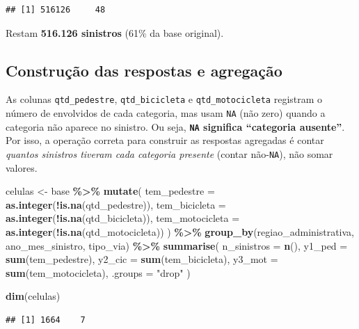 \documentclass[
  11pt,
]{article}
\newenvironment{Shaded}{\begin{snugshade}}{\end{snugshade}}
\newcommand{\AttributeTok}[1]{\textcolor[rgb]{0.13,0.29,0.53}{#1}}
\newcommand{\FunctionTok}[1]{\textcolor[rgb]{0.13,0.29,0.53}{\textbf{#1}}}
\newcommand{\NormalTok}[1]{#1}
\newcommand{\OtherTok}[1]{\textcolor[rgb]{0.56,0.35,0.01}{#1}}
\newcommand{\SpecialCharTok}[1]{\textcolor[rgb]{0.81,0.36,0.00}{\textbf{#1}}}
\newcommand{\StringTok}[1]{\textcolor[rgb]{0.31,0.60,0.02}{#1}}
\begin{document}
\begin{verbatim}
## [1] 516126     48
\end{verbatim}

Restam \textbf{516.126 sinistros} (61\% da base original).

\subsection{Construção das respostas e
agregação}\label{construuxe7uxe3o-das-respostas-e-agregauxe7uxe3o}

As colunas \texttt{qtd\_pedestre}, \texttt{qtd\_bicicleta} e
\texttt{qtd\_motocicleta} registram o número de envolvidos de cada
categoria, mas usam \texttt{NA} (não zero) quando a categoria não
aparece no sinistro. Ou seja, \textbf{\texttt{NA} significa ``categoria
ausente''}. Por isso, a operação correta para construir as respostas
agregadas é contar \emph{quantos sinistros tiveram cada categoria
presente} (contar não-\texttt{NA}), não somar valores.

\begin{Shaded}
\begin{Highlighting}[]
\NormalTok{celulas }\OtherTok{\textless{}{-}}\NormalTok{ base }\SpecialCharTok{\%\textgreater{}\%}
  \FunctionTok{mutate}\NormalTok{(}
    \AttributeTok{tem\_pedestre    =} \FunctionTok{as.integer}\NormalTok{(}\SpecialCharTok{!}\FunctionTok{is.na}\NormalTok{(qtd\_pedestre)),}
    \AttributeTok{tem\_bicicleta   =} \FunctionTok{as.integer}\NormalTok{(}\SpecialCharTok{!}\FunctionTok{is.na}\NormalTok{(qtd\_bicicleta)),}
    \AttributeTok{tem\_motocicleta =} \FunctionTok{as.integer}\NormalTok{(}\SpecialCharTok{!}\FunctionTok{is.na}\NormalTok{(qtd\_motocicleta))}
\NormalTok{  ) }\SpecialCharTok{\%\textgreater{}\%}
  \FunctionTok{group\_by}\NormalTok{(regiao\_administrativa, ano\_mes\_sinistro, tipo\_via) }\SpecialCharTok{\%\textgreater{}\%}
  \FunctionTok{summarise}\NormalTok{(}
    \AttributeTok{n\_sinistros =} \FunctionTok{n}\NormalTok{(),}
    \AttributeTok{y1\_ped =} \FunctionTok{sum}\NormalTok{(tem\_pedestre),}
    \AttributeTok{y2\_cic =} \FunctionTok{sum}\NormalTok{(tem\_bicicleta),}
    \AttributeTok{y3\_mot =} \FunctionTok{sum}\NormalTok{(tem\_motocicleta),}
    \AttributeTok{.groups =} \StringTok{"drop"}
\NormalTok{  )}

\FunctionTok{dim}\NormalTok{(celulas)}
\end{Highlighting}
\end{Shaded}

\begin{verbatim}
## [1] 1664    7
\end{verbatim}
\end{document}
